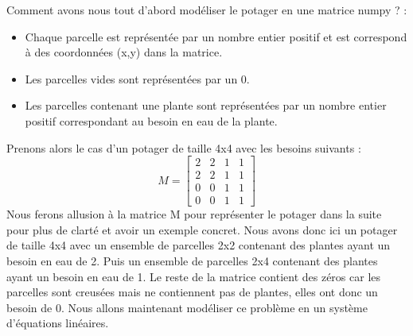 \documentclass[french,a4paper]{article}
\begin{document}
Comment avons nous tout d'abord modéliser le potager en une matrice numpy ? :
\begin{itemize}
    \item Chaque parcelle est représentée par un nombre entier positif et est correspond à des coordonnées (x,y) dans la matrice.
    \item Les parcelles vides sont représentées par un 0.
    \item Les parcelles contenant une plante sont représentées par un nombre entier positif correspondant au besoin en eau de la plante.
\end{itemize}
Prenons alors le cas d'un potager de taille 4x4 avec les besoins suivants :
\newline
\[M = \begin{bmatrix} 2 & 2 & 1 & 1 \\ 2 & 2 & 1 & 1 \\ 0 & 0 & 1 & 1 \\ 0 & 0 & 1 & 1 \end{bmatrix}\]
\newline Nous ferons allusion à la matrice M pour représenter le potager dans la suite pour plus de clarté et avoir un exemple concret.
\newline Nous avons donc ici un potager de taille 4x4 avec un ensemble de parcelles 2x2 contenant des plantes ayant un besoin en eau de 2. Puis un ensemble de parcelles 2x4 contenant des plantes ayant un besoin en eau de 1. Le reste de la matrice contient des zéros car les parcelles sont creusées mais ne contiennent pas de plantes, elles ont donc un besoin de 0.
\newline Nous allons maintenant modéliser ce problème en un système d'équations linéaires.
\end{document}
